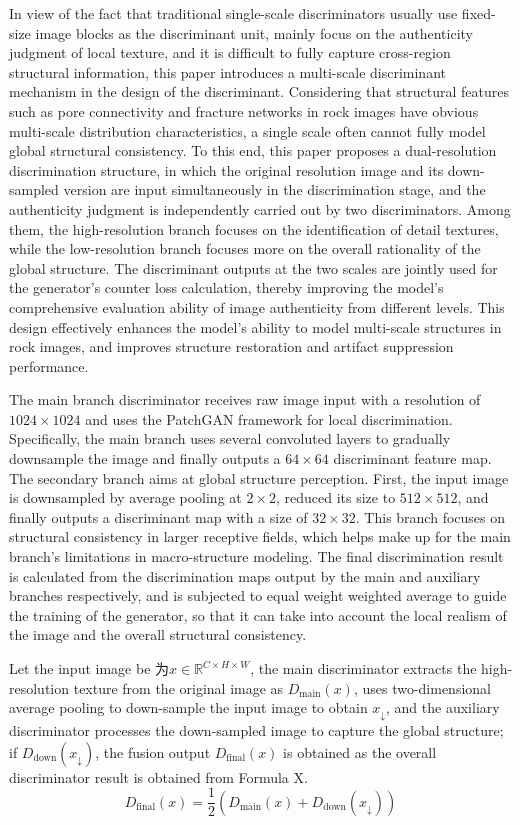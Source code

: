 \documentclass[a4paper,fleqn]{cas-sc}
\begin{document}
In view of the fact that traditional single-scale discriminators usually use fixed-size image blocks as the discriminant unit, mainly focus on the authenticity judgment of local texture, and it is difficult to fully capture cross-region structural information, this paper introduces a multi-scale discriminant mechanism in the design of the discriminant. Considering that structural features such as pore connectivity and fracture networks in rock images have obvious multi-scale distribution characteristics, a single scale often cannot fully model global structural consistency. To this end, this paper proposes a dual-resolution discrimination structure, in which the original resolution image and its down-sampled version are input simultaneously in the discrimination stage, and the authenticity judgment is independently carried out by two discriminators. Among them, the high-resolution branch focuses on the identification of detail textures, while the low-resolution branch focuses more on the overall rationality of the global structure. The discriminant outputs at the two scales are jointly used for the generator's counter loss calculation, thereby improving the model's comprehensive evaluation ability of image authenticity from different levels. This design effectively enhances the model's ability to model multi-scale structures in rock images, and improves structure restoration and artifact suppression performance. 

The main branch discriminator receives raw image input with a resolution of $1024\times1024$ and uses the PatchGAN framework for local discrimination. Specifically, the main branch uses several convoluted layers to gradually downsample the image and finally outputs a $64\times64$ discriminant feature map. The secondary branch aims at global structure perception. First, the input image is downsampled by average pooling at $2 \times 2$, reduced its size to $512 \times 512$, and finally outputs a discriminant map with a size of $32 \times 32$. This branch focuses on structural consistency in larger receptive fields, which helps make up for the main branch's limitations in macro-structure modeling. The final discrimination result is calculated from the discrimination maps output by the main and auxiliary branches respectively, and is subjected to equal weight weighted average to guide the training of the generator, so that it can take into account the local realism of the image and the overall structural consistency. 

Let the input image be 为$x\in\mathbb{R}^{C\times H\times W}$, the main discriminator extracts the high-resolution texture from the original image as $D_\mathrm{main}(x)$, uses two-dimensional average pooling to down-sample the input image to obtain $x_\downarrow$, and the auxiliary discriminator processes the down-sampled image to capture the global structure; if $D_\mathrm{down}(x_\downarrow)$, the fusion output $D_\mathrm{final}(x)$ is obtained as the overall discriminator result is obtained from Formula X.
\begin{equation}
	D_{\mathrm{final}}(x)=\frac{1}{2}(D_{\mathrm{main}}(x)+D_{\mathrm{down}}(x_\downarrow))
\end{equation}
\end{document}
